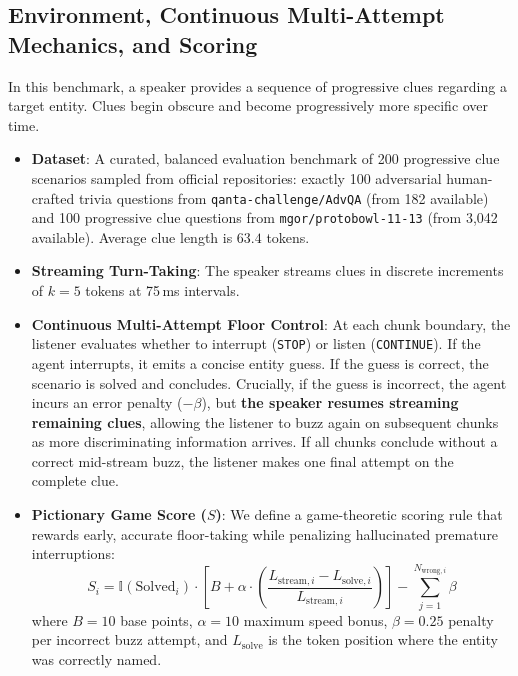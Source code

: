 \documentclass{article}
\begin{document}
\subsection{Environment, Continuous Multi-Attempt Mechanics, and Scoring}
In this benchmark, a speaker provides a sequence of progressive clues regarding a target entity. Clues begin obscure and become progressively more specific over time.
\begin{itemize}
    \item \textbf{Dataset}: A curated, balanced evaluation benchmark of 200 progressive clue scenarios sampled from official repositories: exactly 100 adversarial human-crafted trivia questions from \texttt{qanta-challenge/AdvQA} (from 182 available) and 100 progressive clue questions from \texttt{mgor/protobowl-11-13} (from 3,042 available). Average clue length is $63.4$ tokens.
    \item \textbf{Streaming Turn-Taking}: The speaker streams clues in discrete increments of $k=5$ tokens at 75\,ms intervals.
    \item \textbf{Continuous Multi-Attempt Floor Control}: At each chunk boundary, the listener evaluates whether to interrupt (\texttt{STOP}) or listen (\texttt{CONTINUE}). If the agent interrupts, it emits a concise entity guess. If the guess is correct, the scenario is solved and concludes. Crucially, if the guess is incorrect, the agent incurs an error penalty ($-\beta$), but \textbf{the speaker resumes streaming remaining clues}, allowing the listener to buzz again on subsequent chunks as more discriminating information arrives. If all chunks conclude without a correct mid-stream buzz, the listener makes one final attempt on the complete clue.
    \item \textbf{Pictionary Game Score ($S$)}: We define a game-theoretic scoring rule that rewards early, accurate floor-taking while penalizing hallucinated premature interruptions:
    \begin{equation}
    S_i = \mathbb{I}(\text{Solved}_i) \cdot \left[ B + \alpha \cdot \left(\frac{L_{\text{stream}, i} - L_{\text{solve}, i}}{L_{\text{stream}, i}}\right) \right] - \sum_{j=1}^{N_{\text{wrong}, i}} \beta
    \label{eq:game_score}
    \end{equation}
    where $B = 10$ base points, $\alpha = 10$ maximum speed bonus, $\beta = 0.25$ penalty per incorrect buzz attempt, and $L_{\text{solve}}$ is the token position where the entity was correctly named.
\end{itemize}
\end{document}
